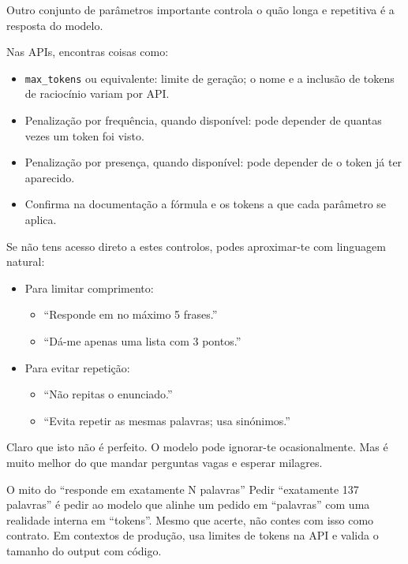 Outro conjunto de parâmetros importante controla o quão longa e repetitiva é a resposta do modelo.

Nas APIs, encontras coisas como:

\begin{itemize}[leftmargin=*]
\item \texttt{max\_tokens} ou equivalente: limite de geração; o nome e a inclusão de tokens de raciocínio variam por API.
\item Penalização por frequência, quando disponível: pode depender de quantas vezes um token foi visto.
\item Penalização por presença, quando disponível: pode depender de o token já ter aparecido.
\item Confirma na documentação a fórmula e os tokens a que cada parâmetro se aplica.
\end{itemize}

Se não tens acesso direto a estes controlos, podes aproximar-te com linguagem natural:

\begin{itemize}[leftmargin=*]
\item Para limitar comprimento:
\begin{itemize}[leftmargin=*]
\item “Responde em no máximo 5 frases.”
\item “Dá-me apenas uma lista com 3 pontos.”
\end{itemize}
\item Para evitar repetição:
\begin{itemize}[leftmargin=*]
\item “Não repitas o enunciado.”
\item “Evita repetir as mesmas palavras; usa sinónimos.”
\end{itemize}
\end{itemize}

Claro que isto não é perfeito. O modelo pode ignorar-te ocasionalmente. Mas é muito melhor do que mandar perguntas vagas e esperar milagres.

\begin{warningboxenv}{O mito do “responde em exatamente N palavras”}
Pedir “exatamente 137 palavras” é pedir ao modelo que alinhe um pedido em “palavras” com uma realidade interna em “tokens”. Mesmo que acerte, não contes com isso como contrato. Em contextos de produção, usa limites de tokens na API e valida o tamanho do output com código.
\end{warningboxenv}

